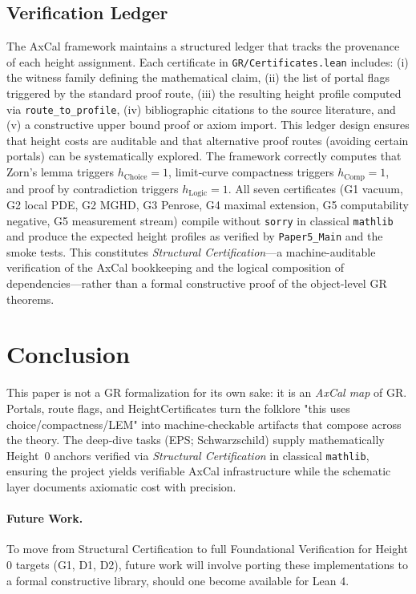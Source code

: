 \documentclass[11pt]{article}
\theoremstyle{definition}
\theoremstyle{remark}
\newcommand{\hChoice}{h_{\mathrm{Choice}}}    %
\newcommand{\hComp}{h_{\mathrm{Comp}}}        %
\newcommand{\hLogic}{h_{\mathrm{Logic}}}      %
\begin{document}
\subsection{Verification Ledger}

The AxCal framework maintains a structured ledger that tracks the provenance of each height assignment. Each certificate in \texttt{GR/Certificates.lean} includes: (i) the witness family defining the mathematical claim, (ii) the list of portal flags triggered by the standard proof route, (iii) the resulting height profile computed via \texttt{route\_to\_profile}, (iv) bibliographic citations to the source literature, and (v) a constructive upper bound proof or axiom import. This ledger design ensures that height costs are auditable and that alternative proof routes (avoiding certain portals) can be systematically explored. The framework correctly computes that Zorn's lemma triggers $\hChoice = 1$, limit‑curve compactness triggers $\hComp = 1$, and proof by contradiction triggers $\hLogic = 1$. All seven certificates (G1 vacuum, G2 local PDE, G2 MGHD, G3 Penrose, G4 maximal extension, G5 computability negative, G5 measurement stream) compile without \texttt{sorry} in classical \texttt{mathlib} and produce the expected height profiles as verified by \texttt{Paper5\_Main} and the smoke tests. This constitutes \emph{Structural Certification}—a machine-auditable verification of the AxCal bookkeeping and the logical composition of dependencies—rather than a formal constructive proof of the object-level GR theorems.

\section{Conclusion}
This paper is not a GR formalization for its own sake: it is an \emph{AxCal map} of GR. Portals, route flags, and HeightCertificates turn the folklore "this uses choice/compactness/LEM" into machine‑checkable artifacts that compose across the theory. The deep‑dive tasks (EPS; Schwarzschild) supply mathematically Height~0 anchors verified via \emph{Structural Certification} in classical \texttt{mathlib}, ensuring the project yields verifiable AxCal infrastructure while the schematic layer documents axiomatic cost with precision. 

\paragraph{Future Work.} To move from Structural Certification to full Foundational Verification for Height 0 targets (G1, D1, D2), future work will involve porting these implementations to a formal constructive library, should one become available for Lean 4.
\end{document}
